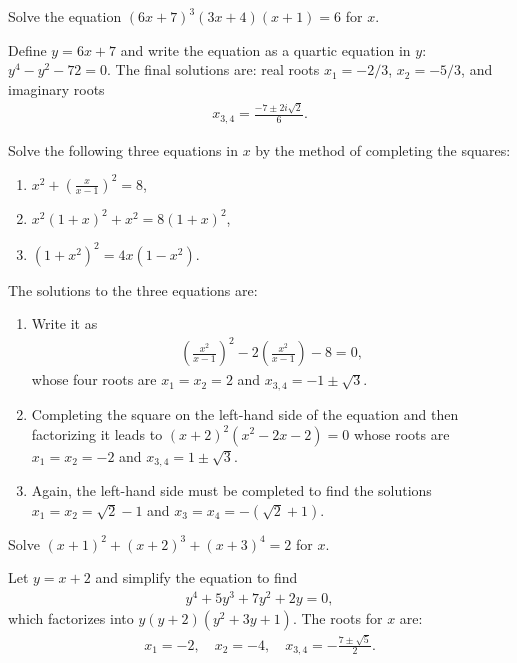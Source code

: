 \documentclass[12pt,a4paper]{memoir}
\theoremstyle{definition}
\begin{document}
\begin{question}
	Solve the equation $(6x+7)^3(3x+4)(x+1)=6$ for $x$.
\end{question}

\begin{solution}
	Define $y=6x+7$ and write the equation as a quartic equation in $y$: $y^4-y^2-72=0$. The final solutions are: real roots $x_1=-2/3$, $x_2=-5/3$, and imaginary roots
	\begin{align*}
		x_{3,4}=\frac{-7\pm 2i\sqrt{2}}{6}.
	\end{align*}
\end{solution}


\begin{question}[name={Quartic Equations \& Completing the Squares}]
	Solve the following three equations in $x$ by the method of completing the squares:
	\begin{enumerate}
		\item $\displaystyle x^2 + \left(\frac{x}{x-1}\right)^2 = 8$,
		\item $x^2(1+x)^2 + x^2 = 8(1+x)^2$,
		\item $(1+x^2)^2 = 4x(1-x^2)$.
	\end{enumerate}
\end{question}

\begin{solution}
	The solutions to the three equations are:
	\begin{enumerate}
		\item Write it as 
		\begin{align*}
			\left(\frac{x^2}{x-1}\right)^2-2\left(\frac{x^2}{x-1}\right)-8=0,
		\end{align*}
		whose four roots are $x_1=x_2=2$ and $x_{3,4}=-1\pm \sqrt{3}$.
		\item Completing the square on the left-hand side of the equation and then factorizing it leads to $(x+2)^2(x^2-2x-2)=0$ whose roots are $x_1=x_2=-2$ and $x_{3,4}=1\pm \sqrt{3}$.
		\item Again, the left-hand side must be completed to find the solutions $x_1=x_2=\sqrt 2 - 1$ and $x_3=x_4=-(\sqrt 2 + 1)$.
	\end{enumerate}
\end{solution}


\begin{question}
	Solve $(x+1)^2+(x+2)^3+(x+3)^4=2$ for $x$.
\end{question}

\begin{solution}
	Let $y=x+2$ and simplify the equation to find
	\begin{align*}
		y^4+5y^3+7y^2+2y=0,
	\end{align*}
	which factorizes into $y(y+2)(y^2+3y+1)$. The roots for $x$ are:
	\begin{align*}
		x_1=-2, \quad x_2=-4,\quad x_{3,4}=-\frac{7\pm\sqrt{5}}{2}.
	\end{align*}
\end{solution}
\end{document}

